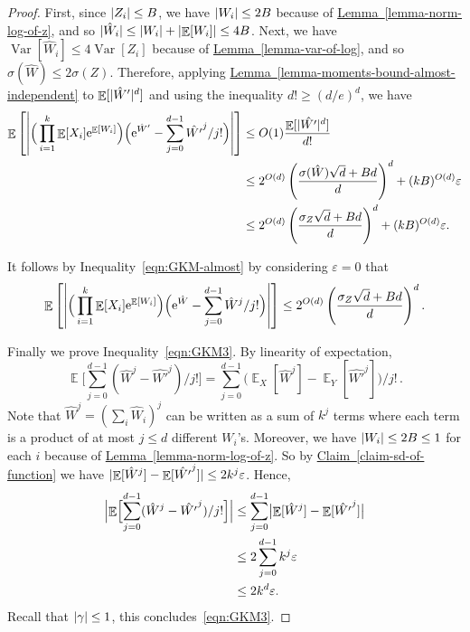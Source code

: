 \documentclass[11pt]{article}
\numberwithin{equation}{section}
\theoremstyle{definition}
\theoremstyle{plain}
\newcommand{\eee}{\mathrm e}
\newcommand{\expref}[2]{\hyperref[#2]{#1~\ref{#2}}}
\def\eps{\varepsilon}
\DeclarePairedDelimiter{\abs}{\lvert}{\rvert}
\DeclareMathOperator*{\E}{\mathbb{E}}                 %
\DeclareMathOperator*{\Var}{Var}                 %
\begin{document}
\begin{proof}
    First, since $\abs{Z_i} \le B$, we have $\abs{W_i} \le 2B$ because of \expref{Lemma}{lemma-norm-log-of-z}, and so $\abs{\hat W_i} \le \abs{W_i} + \abs{\E[W_i]} \le 4B$.
    Next, we have $\Var[\hat W_i] \le 4 \Var[Z_i]$ because of \expref{Lemma}{lemma-var-of-log}, and so $\sigma(\hat W) \le 2 \sigma(Z)$.
    Therefore, applying \expref{Lemma}{lemma-moments-bound-almost-independent} to $\E[\abs{\hat W'}^d]$ and using the inequality $d! \ge (d/e)^d$, we have
    \begin{align}
      \E \left[ \abs*{ \Big( \prod_{i = 1}^k \E[X_i] \eee^{\E[W_i]} \Big) \Big( \eee^{\hat W'} - \sum_{j = 0}^{d-1} {\hat {W'}}^j / j! \Big) } \right]
      &\le O(1) \frac{ \E[ \abs{\hat {W'}}^d ] }{ d! } \nonumber \\
      &\le 2^{O(d)} \left( \frac{ \sigma(\hat W) \sqrt{d} + B d }{ d } \right)^d + (kB)^{O(d)} \eps \nonumber \\
      &\le 2^{O(d)} \left( \frac{ \sigma_Z \sqrt{d} + B d }{ d } \right)^d + (kB)^{O(d)} \eps . \label{eqn:GKM-almost}
    \end{align}

    \medskip

    It follows by Inequality~\eqref{eqn:GKM-almost} by considering $\eps = 0$ that
    \begin{align*}
      \E \left[ \abs*{ \Big( \prod_{i = 1}^k \E[X_i] \eee^{\E[W_i]} \Big) \Big( \eee^{\hat W} - \sum_{j = 0}^{d-1} {\hat W}^j / j! \Big) } \right]
      \le 2^{O(d)} \left( \frac{ \sigma_Z \sqrt{d} + Bd }{ d } \right)^d  .
    \end{align*}

    \medskip

    Finally we prove Inequality~\eqref{eqn:GKM3}.
    By linearity of expectation,
    \[
      \E \Big[ \sum_{j = 0}^{d-1} (\hat W^j - {\hat {W'}}^j) / j! \Big]
      = \sum_{j = 0}^{d-1} \bigl( \E_X[\hat W^j] - \E_Y[{\hat {W'}}^j] \bigr) / j!\, .
    \]
    Note that $\hat W^j = ( \sum_i \hat W_i )^j$ can be written as a sum of
    $k^j$ terms where each term is a product of at most $j \le d$ different
    $W_i$'s.
    Moreover, we have $\abs{W_i} \le 2B \le 1$ for each $i$ because of \expref{Lemma}{lemma-norm-log-of-z}.
    So by \expref{Claim}{claim-sd-of-function} we have $\abs{ \E[\hat W^j] - \E[\hat {W'}^j] } \le 2 k^j \eps$.
    Hence,
    \begin{align*}
      \Bigl| \E \Bigl[ \sum_{j = 0}^{d-1} (\hat W^j - {\hat {W'}}^j) / j! \Bigr] \Bigr|
        &\le \sum_{j = 0}^{d-1} \bigl| \E[\hat W^j] - \E[{\hat {W'}}^j] \bigr| \\
        &\le 2 \sum_{j = 0}^{d-1} k^j \eps \\
        &\le 2 k^d \eps .
    \end{align*}
    Recall that $\abs{\gamma} \le 1$, this concludes~\eqref{eqn:GKM3}.
  \end{proof}
\end{document}
